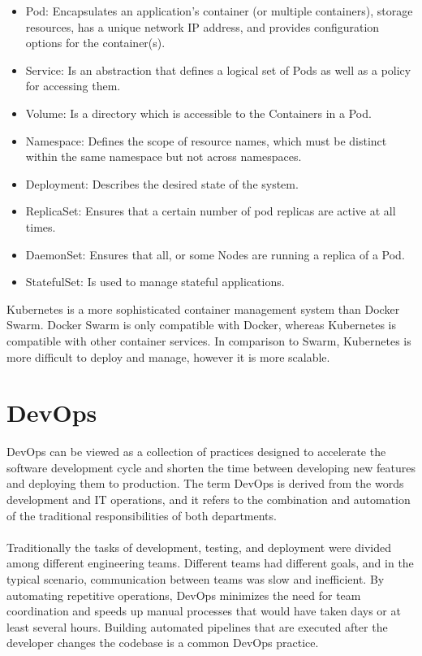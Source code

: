 \begin{itemize}
    \item Pod: Encapsulates an application's container (or multiple containers),
    storage resources, has a unique network IP address, and provides configuration options for the container(s).
    \item Service: Is an abstraction that defines a logical set of Pods as well as a policy for accessing them.
    \item Volume: Is a directory which is accessible to the
    Containers in a Pod.
    \item Namespace: Defines the scope of resource names, which must be distinct within the same namespace but not across namespaces.
    \item Deployment: Describes the desired state of the system.
    \item ReplicaSet: Ensures that a certain number of pod replicas are active at all times.
    \item DaemonSet: Ensures that all, or some Nodes are running a replica of a Pod.
    \item StatefulSet: Is used to manage stateful applications.
\end{itemize}

Kubernetes is a more sophisticated container management system than Docker Swarm.
Docker Swarm is only compatible with Docker, whereas Kubernetes is compatible with other container services.
In comparison to Swarm, Kubernetes is more difficult to deploy and manage, however it is more scalable.

\section{DevOps} %
\label{sec:dev_ops}

DevOps can be viewed as a collection of practices designed to accelerate the software development cycle and shorten the time between developing new features and deploying them to production.
The term DevOps is derived from the words development and IT operations, and it refers to the combination and automation of the traditional responsibilities of both departments.

\paragraph{}

Traditionally the tasks of development, testing, and deployment were divided among different engineering teams.
Different teams had different goals, and in the typical scenario, communication between teams was slow and inefficient.
By automating repetitive operations, DevOps minimizes the need for team coordination and speeds up manual processes that would have taken days or at least several hours.
Building automated pipelines that are executed after the developer changes the codebase is a common DevOps practice.

